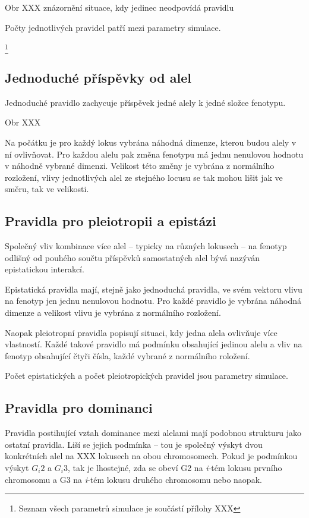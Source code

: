 Obr XXX znázornění situace, kdy jedinec neodpovídá pravidlu

Počty jednotlivých pravidel patří mezi parametry simulace.

\footnote{Seznam všech parametrů simulace je součástí přílohy XXX}

\subsection{Jednoduché příspěvky od alel}

Jednoduché pravidlo zachycuje příspěvek jedné alely k jedné složce fenotypu.

Obr XXX

Na počátku je pro každý lokus vybrána náhodná dimenze, kterou budou alely v ní ovlivňovat. Pro každou alelu pak změna
fenotypu má jednu nenulovou hodnotu v náhodně vybrané dimenzi. Velikost této změny je vybrána z normálního rozložení,
vlivy jednotlivých alel ze stejného locusu se tak mohou lišit jak ve směru, tak ve velikosti.

\subsection{Pravidla pro pleiotropii a epistázi}

Společný vliv kombinace více alel -- typicky na různých lokusech -- na fenotyp odlišný od pouhého součtu příspěvků samostatných alel bývá nazýván epistatickou interakcí.

Epistatická pravidla mají, stejně jako jednoduchá pravidla, ve svém vektoru vlivu na fenotyp jen jednu nenulovou hodnotu. Pro každé pravidlo je vybrána náhodná dimenze a velikost vlivu je vybrána z normálního rozložení.

Naopak pleiotropní pravidla popisují situaci, kdy jedna alela ovlivňuje více vlastností. Každé takové pravidlo má podmínku obsahující jedinou alelu a vliv na fenotyp obsahující čtyři čísla, každé vybrané z normálního roložení.

Počet epistatických a počet pleiotropických pravidel jsou parametry simulace.

\subsection{Pravidla pro dominanci}

Pravidla postihující vztah dominance mezi alelami mají podobnou strukturu jako ostatní pravidla. Liší se jejich podmínka -- tou je společný výskyt dvou konkrétních alel na XXX lokusech na obou chromosomech. Pokud je podmínkou výskyt $G_i{2}$ a $G_i{3}$, tak je lhostejné, zda se obeví G2 na \textit{i}-tém lokusu prvního chromosomu a G3 na \textit{i}-tém lokusu druhého chromosomu nebo naopak.

